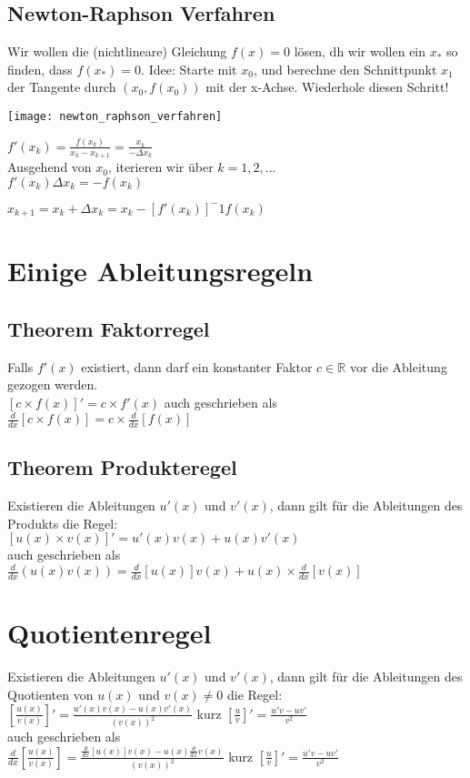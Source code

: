 \documentclass[../main.tex]{subfiles}
\begin{document}
\subsection{Newton-Raphson Verfahren}
Wir wollen die (nichtlineare) Gleichung $f(x) = 0$ lösen, dh wir wollen ein $x_*$ so finden, dass $f(x_*) = 0$. Idee: Starte mit $x_0$, und berechne den Schnittpunkt $x_1$ der Tangente durch $(x_0,f(x_0))$ mit der x-Achse. Wiederhole diesen Schritt! \\
\begin{minipage}{0.5\textwidth}
    \texttt{[image: newton\_raphson\_verfahren]}
\end{minipage} \hfill
\begin{minipage}{0.45\textwidth}
    $f'(x_k) = \frac{f(x_k)}{x_k - x_{k+1}} = \frac{x_k}{-\Delta x_k}$ \\ [7pt]
    Ausgehend von $x_0$, iterieren wir über $k = 1,2,...$ \\ [7pt]
    $f'(x_k)\Delta x_k = -f(x_k)$
\end{minipage}
$x_{k+1} = x_k + \Delta x_k = x_k - [f'(x_k)]^-1f(x_k)$

\section{Einige Ableitungsregeln}
\subsection{Theorem Faktorregel}
Falls $f'(x)$ existiert, dann darf ein konstanter Faktor $c \in \mathbb{R}$ vor die Ableitung gezogen werden. \\ [7pt]
$[c \times f(x)]' = c \times f'(x)$ auch geschrieben als $\frac{d}{dx}[c \times f(x)] = c \times \frac{d}{dx}[f(x)]$

\subsection{Theorem Produkteregel}
Existieren die Ableitungen $u'(x)$ und $v'(x)$, dann gilt für die Ableitungen des Produkts die Regel: \\ [7pt]
$[u(x) \times v(x)]' = u'(x)v(x) + u(x)v'(x)$ \\ [7pt]
auch geschrieben als \\ [7pt]
$\frac{d}{dx}(u(x)v(x))=\frac{d}{dx}[u(x)]v(x) + u(x) \times \frac{d}{dx}[v(x)]$

\section{Quotientenregel}
Existieren die Ableitungen $u'(x)$ und $v'(x)$, dann gilt für die Ableitungen des Quotienten von $u(x)$ und $v(x) \neq 0$ die Regel: \\ [7pt]
$[\frac{u(x)}{v(x)}]' = \frac{u'(x)v(x) - u(x)v'(x)}{(v(x))^2}$ kurz $[\frac{u}{v}]'=\frac{u'v - uv'}{v^2}$ \\ [7pt]
auch geschrieben als \\ [7pt]
$\frac{d}{dx}[\frac{u(x)}{v(x)}] = \frac{\frac{d}{dx}[u(x)]v(x) - u(x) \frac{d}{dx} v(x)}{(v(x))^2}$ kurz $[\frac{u}{v}]'=\frac{u'v - uv'}{v^2}$
\end{document}
